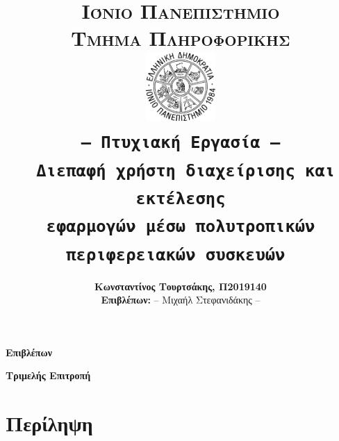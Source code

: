 \documentclass[a4paper,11pt,oneside,openany]{ioniothesis}
\begin{document}
\author{\textbf{Κωνσταντίνος Τουρτσάκης, Π2019140} \\ \textbf{Επιβλέπων:}  -- Μιχαήλ Στεφανιδάκης --}
\title{
\textbf{\LARGE{\textsc{Ιόνιο Πανεπιστήμιο}} 
\bigskip \\
\large{\textsc{Τμήμα Πληροφορικής}}
\bigskip \\ \bigskip \bigskip \bigskip
\bigskip \bigskip 
\includegraphics[width=0.2\textwidth]{./pdffigs/ionio_logo.pdf}
\bigskip \\ \bigskip 
\texttt{-- Πτυχιακή Εργασία --}
\bigskip \\ \bigskip
\textbf{\Large{\texttt{
Διεπαφή χρήστη διαχείρισης και εκτέλεσης \\
εφαρμογών μέσω πολυτροπικών \\
περιφερειακών συσκευών
}}}
\bigskip \\ \bigskip}
}

\maketitle

\chapter*{}

\begin{center}
\Large{\textbf{Επιβλέπων}}
\end{center}

\begin{center}
\Large{\textbf{Τριμελής Επιτροπή}}
\end{center}


\chapter*{Περίληψη} \pagestyle{headings}

\end{document}
